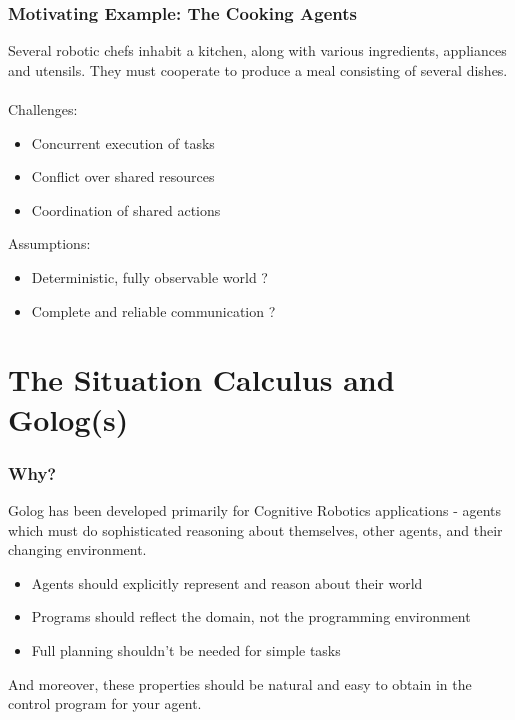 \documentclass{beamer}
\begin{document}
\begin{frame}
\frametitle{Motivating Example: The Cooking Agents}
Several robotic chefs inhabit a kitchen, along with various ingredients,
appliances and utensils.  They must cooperate to produce a meal consisting
of several dishes.\\
\ \\
Challenges:
\begin{itemize}
  \item Concurrent execution of tasks
  \item Conflict over shared resources
  \item Coordination of shared actions
\end{itemize}

Assumptions:
\begin{itemize}
  \item Deterministic, fully observable world ?
  \item Complete and reliable communication ?
\end{itemize}
\end{frame}


\section{The Situation Calculus and Golog(s)}

\begin{frame}
\frametitle{Why?}
Golog has been developed primarily for Cognitive Robotics applications - agents
which must do sophisticated reasoning about themselves, other agents, and their
changing environment.
\begin{itemize}
\item Agents should explicitly represent and reason about their world
\item Programs should reflect the domain, not the programming environment
\item Full planning shouldn't be needed for simple tasks
\end{itemize}

And moreover, these properties should be natural and easy to obtain in the
control program for your agent.
\end{frame}
\end{document}
